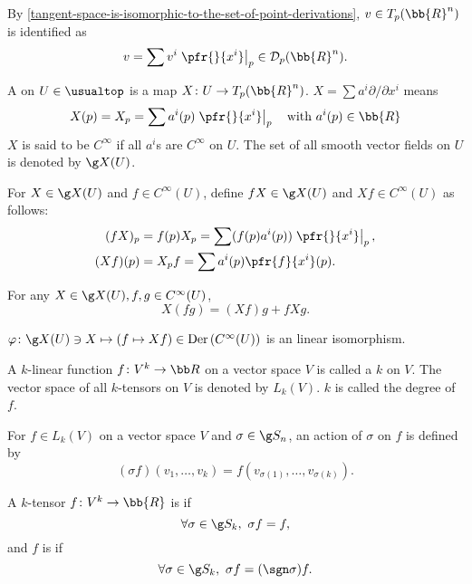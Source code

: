 By \ref{tangent-space-is-isomorphic-to-the-set-of-point-derivations}, $v \in T_p(\bb{R}^n)$ is identified as
\[
v = \sum v^i \left.\pfr{}{x^i}\right|_p \in \mathcal{D}_p(\bb{R}^n).
\]

A  on $U \in \usualtop$ is a map $X \colon U \to T_p(\bb{R}^n)$. $X = \sum a^i \partial / \partial x^i$ means
\[
X(p) = X_p = \sum a^i(p) \left. \pfr{}{x^i} \right|_p \quad \text{with } a^i (p) \in \bb{R}
\]
$X$ is said to be $C^\infty$ if all $a^i$s are $C^\infty$ on $U$. The set of all smooth vector fields on $U$ is denoted by $\g X(U)$.

For $X \in \g X(U)$ and $f \in C^\infty(U)$, define $fX \in \g X(U)$ and $Xf \in C^\infty(U)$ as follows:
\begin{align*}
(fX)_p &= f(p)X_p = \sum (f(p)a^i(p)) \left. \pfr{}{x^i}\right|_p,\\
(Xf)(p) &= X_p f = \sum a^i (p) \pfr{f}{x^i} (p).
\end{align*}

For any $X \in \g X(U), f, g \in C^\infty(U)$,
\[
X(fg) = (Xf)g + fXg.
\]

$\varphi \colon \g X(U) \ni X \mapsto (f \mapsto Xf) \in \mathrm{Der}\, (C^\infty(U))$ is an linear isomorphism.

A $k$-linear function $f \colon V^k \to \bb R$ on a vector space $V$ is called a $k$ on $V$. The vector space of all $k$-tensors on $V$ is denoted by $L_k(V)$. $k$ is called the degree of $f$.

For $f \in L_k(V)$ on a vector space $V$ and $\sigma \in \g S_n$, an action of $\sigma $ on $f$ is defined by
\[
(\sigma f)(v_1, \dotsc, v_k) = f(v_{\sigma(1)},\dotsc, v_{\sigma(k)}).
\]

A $k$-tensor $f \colon V^k \to \bb{R}$ is  if
\[
\forall \sigma \in \g S_k,\ \sigma f  =f,
\]
and $f$ is  if
\[
\forall \sigma \in \g S_k,\ \sigma f = (\sgn \sigma) f.
\]


